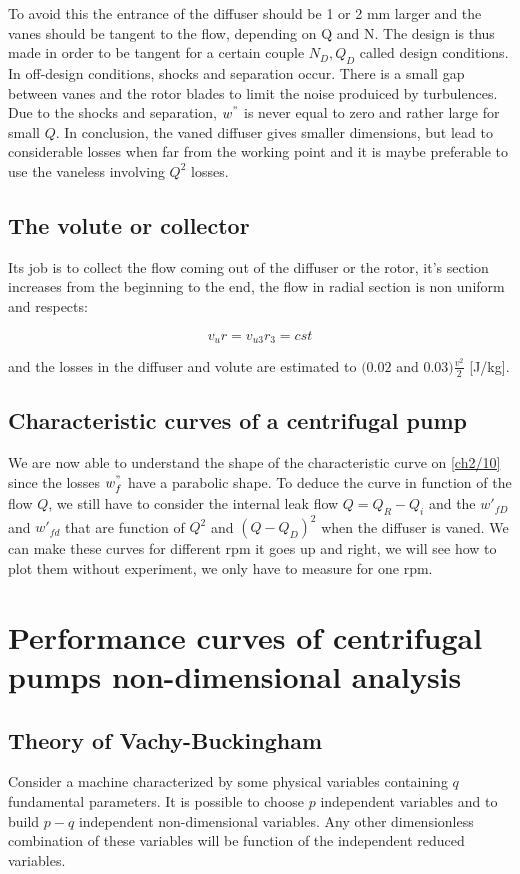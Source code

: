 To avoid this the entrance of the diffuser should be 1 or 2 mm larger and the vanes should be tangent to the flow, depending on Q and N. The design is thus made in order to be tangent for a certain couple $N_D, Q_D$ called design conditions. In off-design conditions, shocks and separation occur. There is a small gap between vanes and the rotor blades to limit the noise produiced by turbulences. Due to the shocks and separation, $w^"$ is never equal to zero and rather large for small $Q$. In conclusion, the vaned diffuser gives smaller dimensions, but lead to considerable losses when far from the working point and it is maybe preferable to use the vaneless involving $Q^2$ losses.  

\subsection{The volute or collector}
Its job is to collect the flow coming out of the diffuser or the rotor, it's section increases from the beginning to the end, the flow in radial section is non uniform and respects:

\begin{equation}
v_u r = v_{u3}r_3 = cst
\end{equation}

and the losses in the diffuser and volute are estimated to $(0.02$ and $0.03)\frac{v^2}{2}$ [J/kg].

\subsection{Characteristic curves of a centrifugal pump}
We are now able to understand the shape of the characteristic curve on \autoref{ch2/10} since the losses $w^"_f$ have a parabolic shape. To deduce the curve in function of the flow $Q$, we still have to consider the internal leak flow $Q = Q_R - Q_i$ and the $w'_{fD}$ and $w'_{fd}$ that are function of $Q^2$ and $(Q-Q_D)^2$ when the diffuser is vaned. We can make these curves for different rpm it goes up and right, we will see how to plot them without experiment, we only have to measure for one rpm. 


\section{Performance curves of centrifugal pumps non-dimensional analysis}
\subsection{Theory of Vachy-Buckingham}
Consider a machine characterized by some physical variables containing $q$ fundamental parameters. It is possible to choose $p$ independent variables and to build $p-q$  independent non-dimensional variables. Any other dimensionless combination of these variables will be function of the independent reduced variables. 


